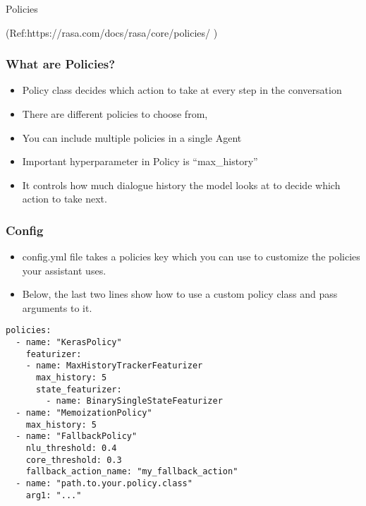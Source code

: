 \begin{frame}[fragile]\frametitle{}
\begin{center}
{\Large Policies}

{\tiny (Ref:https://rasa.com/docs/rasa/core/policies/ )}
\end{center}
\end{frame}

 \begin{frame}[fragile]\frametitle{What are Policies?}
\begin{itemize}
\item Policy class decides which action to take at every step in the conversation
\item There are different policies to choose from, 
\item You can include multiple policies in a single Agent
\item Important hyperparameter in Policy is ``max\_history'' 
\item It controls how much dialogue history the model looks at to decide which action to take next.
\end{itemize}
\end{frame}

 \begin{frame}[fragile]\frametitle{Config}
\begin{itemize}
\item config.yml file takes a policies key which you can use to customize the policies your assistant uses.
\item Below, the last two lines show how to use a custom policy class and pass arguments to it.
\end{itemize}

\begin{lstlisting}
policies:
  - name: "KerasPolicy"
    featurizer:
    - name: MaxHistoryTrackerFeaturizer
      max_history: 5
      state_featurizer:
        - name: BinarySingleStateFeaturizer
  - name: "MemoizationPolicy"
    max_history: 5
  - name: "FallbackPolicy"
    nlu_threshold: 0.4
    core_threshold: 0.3
    fallback_action_name: "my_fallback_action"
  - name: "path.to.your.policy.class"
    arg1: "..."
\end{lstlisting}



\end{frame}

